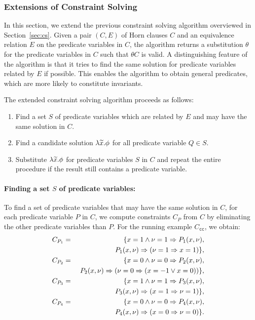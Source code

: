 \subsubsection{Extensions of Constraint Solving}
\label{sec:extcs}

In this section, we extend the previous constraint solving algorithm
overviewed in Section~\ref{sec:cs}.  Given a pair \((C,E)\) of Horn
clauses \(C\) and an equivalence relation \(E\) on the predicate
variables in \(C\), the algorithm returns a substitution \(\theta\) for
the predicate variables in \(C\) such that \(\theta C\) is valid.  A
distinguishing feature of the algorithm is that it tries to find the
same solution for predicate variables related by \(E\) if possible.
This enables the algorithm to obtain general predicates, which are more
likely to constitute invariants. %


The extended constraint solving algorithm proceeds as follows:
\begin{enumerate}
\item Find a set \(S\) of predicate variables which are related by \(E\)
and may have the same solution in \(C\).
\item Find a candidate solution \(\lambda \widetilde{x}.\phi\) for all
predicate variable \(Q \in S\).
\item Substitute \(\lambda \widetilde{x}.\phi\) for predicate variables \(S\)
in \(C\) and repeat the entire procedure if the result still contains a
predicate variable.
\end{enumerate}

\paragraph{Finding a set \(S\) of predicate variables:}
To find a set of predicate variables that may have the same solution in
\(C\), for each predicate variable \(P\) in \(C\), we compute
constraints \(C_P\) from \(C\) by eliminating the other predicate
variables than \(P\).
%
For the running example \(C_{\texttt{cc}}\), we obtain:
\begin{eqnarray*}
C_{P_1}&=&\{x=1 \land \nu=1 \Rightarrow P_1(x,\nu), \\
&&\ P_1(x,\nu) \Rightarrow (\nu=1 \Rightarrow x=1)\}, \\
C_{P_2}&=&\{x=0 \land \nu=0 \Rightarrow P_2(x,\nu), \\
&&\ P_2(x,\nu) \Rightarrow (\nu=0 \Rightarrow (x=-1 \lor x=0))\}, \\
C_{P_3}&=&\{x=1 \land \nu=1 \Rightarrow P_3(x,\nu), \\
&&\ P_3(x,\nu) \Rightarrow (x=1 \Rightarrow \nu=1)\}, \\
C_{P_4}&=&\{x=0 \land \nu=0 \Rightarrow P_4(x,\nu), \\
&&\ P_4(x,\nu) \Rightarrow (x=0 \Rightarrow \nu=0)\}.
\end{eqnarray*}

